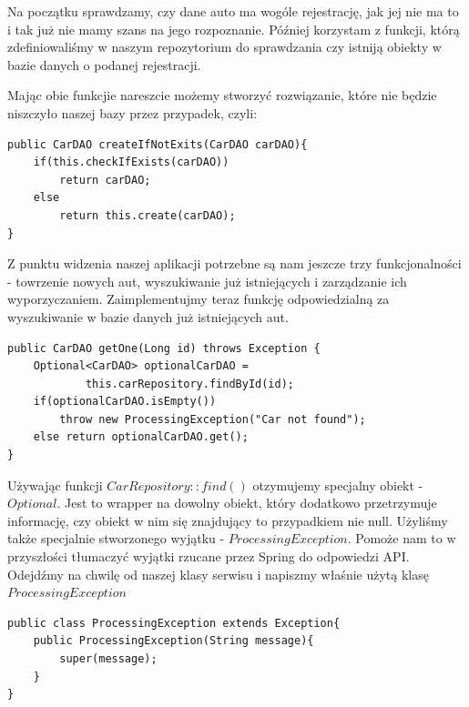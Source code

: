 \documentclass{article}
\begin{document}
        Na początku sprawdzamy, czy dane auto ma wogóle rejestrację, jak jej nie ma to i tak już nie mamy szans na jego rozpoznanie. Później korzystam z funkcji, którą zdefiniowaliśmy w naszym repozytorium do sprawdzania czy istniją obiekty w bazie danych o podanej rejestracji.
        
        Mając obie funkcjie nareszcie możemy stworzyć rozwiązanie, które nie będzie niszczyło naszej bazy przez przypadek, czyli:
        \begin{verbatim}
public CarDAO createIfNotExits(CarDAO carDAO){
    if(this.checkIfExists(carDAO))
        return carDAO;
    else
        return this.create(carDAO);
}
        \end{verbatim}
        
        Z punktu widzenia naszej aplikacji potrzebne są nam jeszcze trzy funkcjonalności - towrzenie nowych aut, wyszukiwanie już istniejących i zarządzanie ich wyporzyczaniem. Zaimplementujmy teraz funkcję odpowiedzialną za wyszukiwanie w bazie danych już istniejących aut.
        \begin{verbatim}
public CarDAO getOne(Long id) throws Exception {
    Optional<CarDAO> optionalCarDAO =
            this.carRepository.findById(id);
    if(optionalCarDAO.isEmpty())
        throw new ProcessingException("Car not found");
    else return optionalCarDAO.get();
}
        \end{verbatim}
        
        Używając funkcji $CarRepository::find()$ otzymujemy specjalny obiekt - $Optional$. Jest to wrapper na dowolny obiekt, który dodatkowo przetrzymuje informację, czy obiekt w nim się znajdujący to przypadkiem nie null. Użyliśmy także specjalnie stworzonego wyjątku - $ProcessingException$. Pomoże nam to w przyszłości tłumaczyć wyjątki rzucane przez Spring do odpowiedzi API. Odejdźmy na chwilę od naszej klasy serwisu i napiszmy właśnie użytą klasę $ProcessingException$
        \begin{verbatim}
public class ProcessingException extends Exception{
    public ProcessingException(String message){
        super(message);
    }
}
        \end{verbatim}
        
\end{document}
